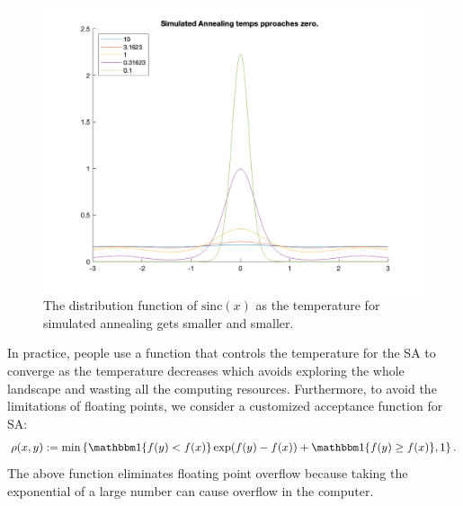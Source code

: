 \documentclass[]{article}
\theoremstyle{definition}
\begin{document}
        \begin{figure}[H]
            \centering 
            \includegraphics[width=14cm]{sa_temp.png}
            \caption{The distribution function of $\text{sinc}(x)$ as the temperature for simulated annealing gets smaller and smaller.}
            \label{fig:sa_temp}
        \end{figure}
        In practice, people use a function that controls the temperature for the SA to converge as the temperature decreases which avoids exploring the whole landscape and wasting all the computing resources. Furthermore, to avoid the limitations of floating points, we consider a customized acceptance function for SA: 
        \begin{align*}
            \rho(x, y) := \min
            \left\lbrace
            \mathbbm 1 \{f(y) < f(x)\}\exp(f(y) - f(x)) + \mathbbm 1 \{f(y) \ge f(x)\}, 1
            \right\rbrace. 
        \end{align*}
        The above function eliminates floating point overflow because taking the exponential of a large number can cause overflow in the computer. 
\end{document}
